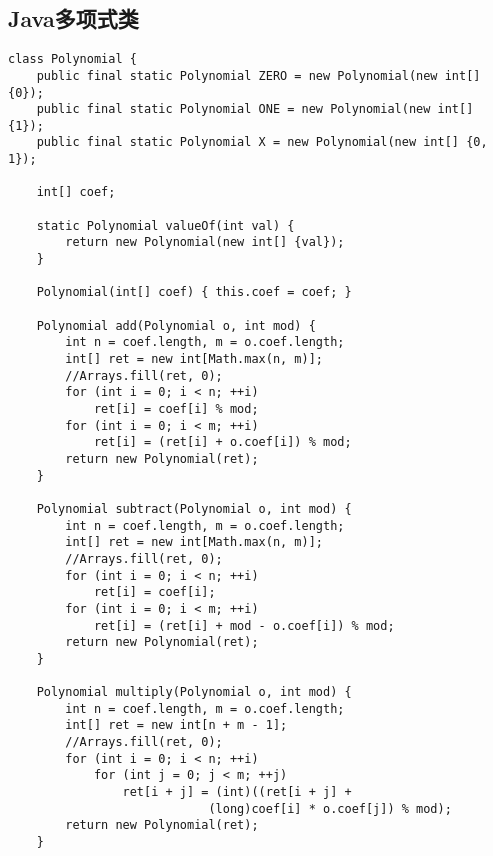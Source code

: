 \documentclass{article}
\begin{document}
\subsection{Java多项式类}

\begin{lstlisting}
class Polynomial {
    public final static Polynomial ZERO = new Polynomial(new int[] {0});
    public final static Polynomial ONE = new Polynomial(new int[] {1});
    public final static Polynomial X = new Polynomial(new int[] {0, 1});

    int[] coef;

    static Polynomial valueOf(int val) {
        return new Polynomial(new int[] {val});
    }

    Polynomial(int[] coef) { this.coef = coef; }

    Polynomial add(Polynomial o, int mod) {
        int n = coef.length, m = o.coef.length;
        int[] ret = new int[Math.max(n, m)];
        //Arrays.fill(ret, 0);
        for (int i = 0; i < n; ++i)
            ret[i] = coef[i] % mod;
        for (int i = 0; i < m; ++i)
            ret[i] = (ret[i] + o.coef[i]) % mod;
        return new Polynomial(ret);
    }

    Polynomial subtract(Polynomial o, int mod) {
        int n = coef.length, m = o.coef.length;
        int[] ret = new int[Math.max(n, m)];
        //Arrays.fill(ret, 0);
        for (int i = 0; i < n; ++i)
            ret[i] = coef[i];
        for (int i = 0; i < m; ++i)
            ret[i] = (ret[i] + mod - o.coef[i]) % mod;
        return new Polynomial(ret);
    }

    Polynomial multiply(Polynomial o, int mod) {
        int n = coef.length, m = o.coef.length;
        int[] ret = new int[n + m - 1];
        //Arrays.fill(ret, 0);
        for (int i = 0; i < n; ++i)
            for (int j = 0; j < m; ++j)
                ret[i + j] = (int)((ret[i + j] +
                            (long)coef[i] * o.coef[j]) % mod);
        return new Polynomial(ret);
    }


\end{lstlisting}
\end{document}
